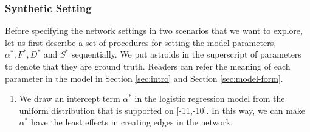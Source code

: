 \documentclass[AMS,STIX1COL]{WileyNJD-v2}
\begin{document}
{\subsubsection{Synthetic Setting} \label{sec:Syn-set}
Before specifying the network settings in two scenarios that we want to explore, let us first describe a set of procedures for setting the model parameters, $\alpha^*, F^*, D^*$ and $S^*$ sequentially.
We put astroids in the superscript of parameters to denote that they are ground truth.
Readers can refer the meaning of each parameter in the model in Section \ref{sec:intro} and Section \ref{sec:model-form}.

\begin{enumerate}
    \item We draw an intercept term $\alpha^*$ in the logistic regression model from the uniform distribution that is supported on [-11,-10].
        In this way, we can make $\alpha^*$ have the least effects in creating edges in the network.


\end{enumerate}}
\end{document}
